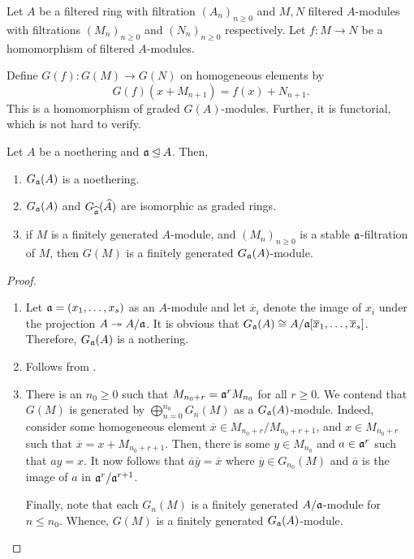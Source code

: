 \begin{definition}[Functoriality of $G$]
    Let $A$ be a filtered ring with filtration $(A_n)_{n\ge 0}$ and $M, N$ filtered $A$-modules with filtrations $(M_n)_{n\ge 0}$ and $(N_n)_{n\ge 0}$ respectively. Let $f: M\to N$ be a homomorphism of filtered $A$-modules. 

    Define $G(f):G(M)\to G(N)$ on homogeneous elements by 
    \begin{equation*}
        G(f)(x + M_{n + 1}) = f(x) + N_{n + 1}.
    \end{equation*}
    This is a homomorphism of graded $G(A)$-modules. Further, it is functorial, which is not hard to verify.
\end{definition}


\begin{theorem}
    Let $A$ be a noethering and $\mathfrak a\unlhd A$. Then, 
    \begin{enumerate}[label=(\alph*)]
        \item $G_\mathfrak a(A)$ is a noethering. 
        \item $G_\mathfrak a(A)$ and $G_{\widehat{\mathfrak a}}(\widehat{A})$ are isomorphic as graded rings. 
        \item if $M$ is a finitely generated $A$-module, and $(M_n)_{n\ge 0}$ is a stable $\mathfrak a$-filtration of $M$, then $G(M)$ is a finitely generated $G_\mathfrak a(A)$-module.
    \end{enumerate}
\end{theorem}
\begin{proof}
\begin{enumerate}[label=(\alph*)]
    \item Let $\mathfrak a = (x_1,\dots,x_s)$ as an $A$-module and let $\overline x_i$ denote the image of $x_i$ under the projection $A\twoheadrightarrow A/\mathfrak a$. It is obvious that $G_\mathfrak a(A)\cong A/\mathfrak a[\overline x_1,\dots,\overline x_s]$. Therefore, $G_\mathfrak a(A)$ is a nothering.

    \item Follows from .

    \item There is an $n_0\ge 0$ such that $M_{n_0 + r} = \mathfrak a^r M_{n_0}$ for all $r\ge 0$. We contend that $G(M)$ is generated by $\bigoplus_{n = 0}^{n_0} G_n(M)$ as a $G_\mathfrak a(A)$-module. Indeed, consider some homogeneous element $\overline x\in M_{n_0 + r}/M_{n_0 + r + 1}$, and $x\in M_{n_0 + r}$ such that $\overline x = x + M_{n_0 + r + 1}$. Then, there is some $y\in M_{n_0}$ and $a\in\mathfrak a^r$ such that $ay = x$. It now follows that $\overline a\overline y = \overline x$ where $\overline y\in G_{n_0}(M)$ and $\overline a$ is the image of $a$ in $\mathfrak a^r/\mathfrak a^{r + 1}$.

    Finally, note that each $G_n(M)$ is a finitely generated $A/\mathfrak a$-module for $n\le n_0$. Whence, $G(M)$ is a finitely generated $G_\mathfrak a(A)$-module.\qedhere
\end{enumerate} 
\end{proof}

